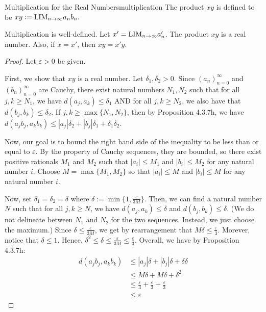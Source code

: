 \begin{definition}{Multiplication for the Real Numbers}{multiplication}
    The product $xy$ is defined to be
    $xy: = \text{LIM}_{n \to \infty} a_n b_n.$
\end{definition}
\begin{problem}{Multiplication is well-defined.}
    Let $x' = \text{LIM}_{n \to \infty} a_n'$. The product $xy$ is a real number. Also, if $x = x'$, then $xy = x'y.$
\end{problem}
\begin{proof}
    Let $\varepsilon > 0$ be given.
    
    First, we show that $xy$ is a real number.
    Let $\delta_1, \delta_2 > 0.$ Since $(a_n)_{n=0}^\infty$ and $(b_n)_{n=0}^\infty$ are Cauchy, 
    there exist natural numbers $N_1, N_2$ such that 
    for all $j, k \geq N_1$, we have $d(a_j, a_k) \leq \delta_1$ AND for all $j, k \geq N_2$, we also have that $d(b_j, b_k) \leq \delta_2.$
    If $j, k \geq \max \{N_1, N_2 \}$, then by Proposition 4.3.7h, we have 
    $d(a_j b_j, a_k b_k) \leq |a_j| \delta_2 + |b_j| \delta_1 + \delta_1 \delta_2.$
    
    Now, our goal is to bound the right hand side of the inequality to be less than or equal to $\varepsilon.$
    By the property of Cauchy sequences, they are bounded, so there exist positive rationals $M_1$ and $M_2$ such that $|a_i| \leq M_1$ and $|b_i| \leq M_2$ for any natural number $i$.
    Choose $M = \max \{M_1, M_2 \}$ so that $|a_i| \leq M$ and $|b_i| \leq M$ for any natural number $i$.
    
    Now, set $\delta_1 = \delta_2 = \delta$ where $\delta := \min \{1, \frac{\varepsilon}{3M} \}$.
    Then, we can find a natural number $N$ such that
    for all $j, k \geq N$, we have $d(a_j, a_k) \leq \delta$ and $d(b_j, b_k) \leq \delta$.
    (We do not delineate between $N_1$ and $N_2$ for the two sequences. 
    Instead, we just choose the maximum.)
    Since $\delta \leq \frac{\varepsilon}{3M}$, we get by rearrangement that $M \delta \leq \frac{\varepsilon}{3}.$
    Morever, notice that $\delta \leq 1$. 
    Hence, $\delta ^ 2 \leq \delta \leq \frac{\varepsilon}{3M} \leq \frac{\varepsilon}{3}.$
    Overall, we have by Proposition 4.3.7h:
    \begin{align*}
        d(a_j b_j, a_k b_k) &\leq |a_j| \delta + |b_j| \delta + \delta \delta  \\
        &\leq M \delta + M \delta + \delta^2 \\
        &\leq \frac{\varepsilon}{3} + \frac{\varepsilon}{3} + \frac{\varepsilon}{3} \\
        &\leq \varepsilon
    \end{align*}


\end{proof}
